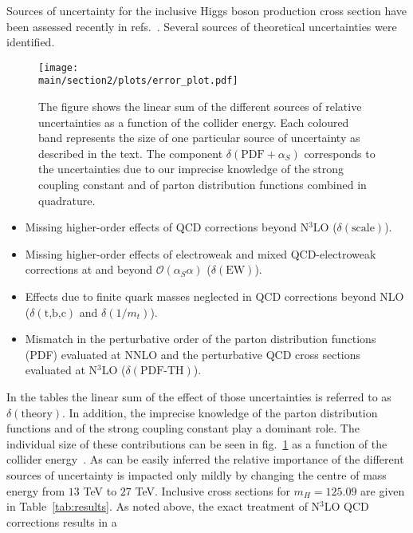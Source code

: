 Sources of uncertainty for the inclusive Higgs boson production cross section have been assessed recently in refs.~\cite{Anastasiou:2016cez,Harlander:2016hcx,Bonvini:2016frm,deFlorian:2016spz}. 
Several sources of theoretical uncertainties were identified.
\begin{figure}[h]
\begin{center}
    \texttt{[image: \\main/section2/plots/error\_plot.pdf]}
    \caption{
    The figure shows the linear sum of the different sources of relative uncertainties as a function of the collider energy. 
    Each coloured band represents the size of one particular source of uncertainty as described in the text.
    The component $\delta(\text{PDF}+\alpha_S)$ corresponds to the uncertainties due to our imprecise knowledge of the strong coupling constant and of parton distribution functions combined in quadrature.
        \label{fig:errorplot}}
        \end{center}
\end{figure}
\begin{itemize}
\item Missing higher-order effects of QCD corrections beyond N$^3$LO ($\delta(\text{scale})$).
\item Missing higher-order effects of electroweak and mixed QCD-electroweak corrections at and beyond $\mathcal{O}(\alpha_S \alpha)$ ($\delta(\text{EW})$).
\item Effects due to finite quark masses neglected in QCD corrections beyond NLO  ($\delta(\text{t,b,c})$ and $\delta(1/m_t)$).
\item Mismatch in the perturbative order of the parton distribution functions (PDF) evaluated at NNLO and the perturbative QCD cross sections evaluated at N$^3$LO ($\delta(\text{PDF-TH})$).
\end{itemize}
In the tables the linear sum of the effect of those uncertainties
is referred to as $\delta(\text{theory})$.  In addition, the imprecise
knowledge of the parton distribution functions and of the strong coupling
constant play a dominant role.  The individual size of these
contributions can be seen in fig.~\ref{fig:errorplot} as a function of
the collider energy~\cite{Dulat:2018rbf}.  As can be easily inferred
the relative importance of the different sources of uncertainty is
impacted only mildly by changing the centre of mass energy from $13$
TeV to $27$ TeV.  Inclusive cross sections for
$m_H=125.09$ \UGeV are given in Table~\ref{tab:results}. As noted above, the
exact treatment of N$^3$LO QCD corrections results in a
